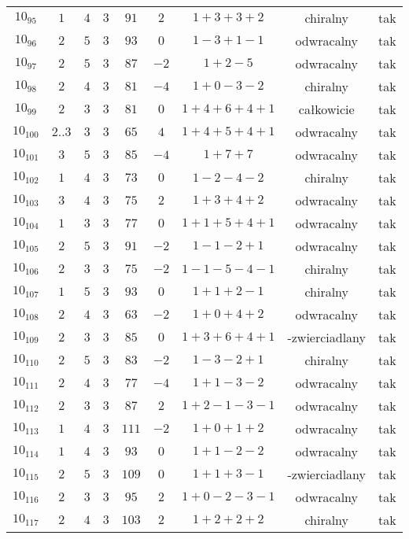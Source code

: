 \begin{longtable}{ccccccccc}
$10_{95}$ & $1$ & $4$ & $3$ & $91$ & $2$ & $1+3+3+2$ & chiralny & tak \\
$10_{96}$ & $2$ & $5$ & $3$ & $93$ & $0$ & $1-3+1-1$ & odwracalny & tak \\
$10_{97}$ & $2$ & $5$ & $3$ & $87$ & $-2$ & $1+2-5$ & odwracalny & tak \\
$10_{98}$ & $2$ & $4$ & $3$ & $81$ & $-4$ & $1+0-3-2$ & chiralny & tak \\
$10_{99}$ & $2$ & $3$ & $3$ & $81$ & $0$ & $1+4+6+4+1$ & całkowicie & tak \\
$10_{100}$ & $2..3$ & $3$ & $3$ & $65$ & $4$ & $1+4+5+4+1$ & odwracalny & tak \\
$10_{101}$ & $3$ & $5$ & $3$ & $85$ & $-4$ & $1+7+7$ & odwracalny & tak \\
$10_{102}$ & $1$ & $4$ & $3$ & $73$ & $0$ & $1-2-4-2$ & chiralny & tak \\
$10_{103}$ & $3$ & $4$ & $3$ & $75$ & $2$ & $1+3+4+2$ & odwracalny & tak \\
$10_{104}$ & $1$ & $3$ & $3$ & $77$ & $0$ & $1+1+5+4+1$ & odwracalny & tak \\
$10_{105}$ & $2$ & $5$ & $3$ & $91$ & $-2$ & $1-1-2+1$ & odwracalny & tak \\
$10_{106}$ & $2$ & $3$ & $3$ & $75$ & $-2$ & $1-1-5-4-1$ & chiralny & tak \\
$10_{107}$ & $1$ & $5$ & $3$ & $93$ & $0$ & $1+1+2-1$ & chiralny & tak \\
$10_{108}$ & $2$ & $4$ & $3$ & $63$ & $-2$ & $1+0+4+2$ & odwracalny & tak \\
$10_{109}$ & $2$ & $3$ & $3$ & $85$ & $0$ & $1+3+6+4+1$ & -zwierciadlany & tak \\
$10_{110}$ & $2$ & $5$ & $3$ & $83$ & $-2$ & $1-3-2+1$ & chiralny & tak \\
$10_{111}$ & $2$ & $4$ & $3$ & $77$ & $-4$ & $1+1-3-2$ & odwracalny & tak \\
$10_{112}$ & $2$ & $3$ & $3$ & $87$ & $2$ & $1+2-1-3-1$ & odwracalny & tak \\
$10_{113}$ & $1$ & $4$ & $3$ & $111$ & $-2$ & $1+0+1+2$ & odwracalny & tak \\
$10_{114}$ & $1$ & $4$ & $3$ & $93$ & $0$ & $1+1-2-2$ & odwracalny & tak \\
$10_{115}$ & $2$ & $5$ & $3$ & $109$ & $0$ & $1+1+3-1$ & -zwierciadlany & tak \\
$10_{116}$ & $2$ & $3$ & $3$ & $95$ & $2$ & $1+0-2-3-1$ & odwracalny & tak \\
$10_{117}$ & $2$ & $4$ & $3$ & $103$ & $2$ & $1+2+2+2$ & chiralny & tak \\

\end{longtable}
